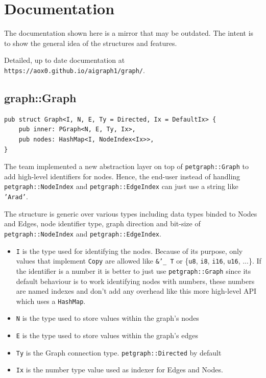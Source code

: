 \newpage
\section{Documentation}

The documentation shown here is a mirror that may be outdated.
The intent is to show the general idea of the structures and features.

Detailed, up to date documentation at \texttt{https://aox0.github.io/aigraph1/graph/}.

\subsection{graph::Graph}

\begin{verbatim}
pub struct Graph<I, N, E, Ty = Directed, Ix = DefaultIx> {
    pub inner: PGraph<N, E, Ty, Ix>,
    pub nodes: HashMap<I, NodeIndex<Ix>>,
}
\end{verbatim}

The team implemented a new abstraction layer on top of \texttt{petgraph::Graph} to add high-level identifiers for nodes.
Hence, the end-user instead of handling \texttt{petgraph::NodeIndex} and \texttt{petgraph::EdgeIndex} can just use a string like \texttt{'Arad'}.

The structure is generic over various types including data types binded to Nodes and Edges, node identifier type, graph direction and bit-size of
\texttt{petgraph::NodeIndex} and \texttt{petgraph::EdgeIndex}.

\begin{itemize}
 \item \texttt{I} is the type used for identifying the nodes. Because of its purpose, only values that implement
 \texttt{Copy} are allowed like \texttt{\&'\_ T} or \{\texttt{u8}, \texttt{i8}, \texttt{i16}, \texttt{u16}, ...\}.
 If the identifier is a number it is better to just use \texttt{petgraph::Graph} since its default
 behaviour is to work identifying nodes with numbers, these numbers are named indexes and don't add any overhead
 like this more high-level API which uses a \texttt{HashMap}.
 \item \texttt{N} is the type used to store values within the graph's nodes
 \item \texttt{E} is the type used to store values within the graph's edges
 \item \texttt{Ty} is the Graph connection type. \texttt{petgraph::Directed} by default
 \item \texttt{Ix} is the number type value used as indexer for Edges and Nodes.
\end{itemize}

